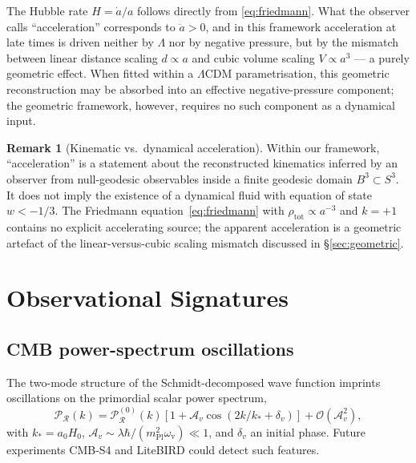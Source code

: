 \documentclass[12pt,a4paper]{article}
\theoremstyle{plain}
\theoremstyle{definition}
\newtheorem{remark}[theorem]{Remark}
\newcommand{\Mpl}{m_{\mathrm{Pl}}}
\newcommand{\omv}{\omega_{\mathrm{v}}}
\begin{document}
The Hubble rate $H = \dot a/a$ follows directly from
\eqref{eq:friedmann}.
What the observer calls ``acceleration'' corresponds to $\ddot a > 0$,
and in this framework acceleration at late times is driven neither by
$\Lambda$ nor by negative pressure, but by the mismatch between linear
distance scaling $d\propto a$ and cubic volume scaling $V\propto a^3$
--- a purely geometric effect.
When fitted within a $\Lambda$CDM parametrisation, this geometric
reconstruction may be absorbed into an effective negative-pressure
component; the geometric framework, however, requires no such component
as a dynamical input.

\begin{remark}[Kinematic vs.\ dynamical acceleration]
\label{rem:kinematic_accel}
Within our framework, ``acceleration'' is a statement about the
reconstructed kinematics inferred by an observer from null-geodesic
observables inside a finite geodesic domain $B^3\subset S^3$.
It does not imply the existence of a dynamical fluid with equation
of state $w < -1/3$.
The Friedmann equation~\eqref{eq:friedmann} with $\rho_{\mathrm{tot}}
\propto a^{-3}$ and $k = +1$ contains no explicit accelerating source;
the apparent acceleration is a geometric artefact of the
linear-versus-cubic scaling mismatch discussed in
\S\ref{sec:geometric}.
\end{remark}

\section{Observational Signatures}
\label{sec:observations}

\subsection{CMB power-spectrum oscillations}

The two-mode structure of the Schmidt-decomposed wave function imprints
oscillations on the primordial scalar power spectrum,
\begin{equation}
  \mathcal{P}_\mathcal{R}(k)
  = \mathcal{P}_\mathcal{R}^{(0)}(k)\!\left[
    1 + \mathcal{A}_v\cos(2k/k_* + \delta_v)
  \right] + \mathcal{O}(\mathcal{A}_v^2),
  \label{eq:cmb}
\end{equation}
with $k_* = a_0 H_0$,
$\mathcal{A}_v \sim \lambda\hbar/(\Mpl^2\omv) \ll 1$,
and $\delta_v$ an initial phase.
Future experiments CMB-S4 \cite{CMBS4} and LiteBIRD \cite{LiteBIRD2022}
could detect such features.
\end{document}
